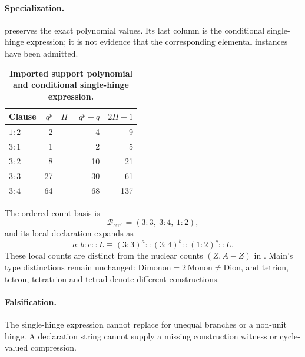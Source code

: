 \paragraph{Specialization.}
 preserves the exact polynomial values. Its last column is the conditional single-hinge expression; it is not evidence that the corresponding elemental instances have been admitted.
\begin{table}[H]
\centering
\caption{\textbf{Imported support polynomial and conditional single-hinge expression.}}
\label{tab:matter1-curling-curl-primitives}
\begin{tabular}{@{}lrrr@{}}
\toprule
Clause & \(q^p\) & \(\Pi=q^p+q\) & \(2\Pi+1\)\\
\midrule
\(1{:}2\) & 2 & 4 & 9\\
\(3{:}1\) & 1 & 2 & 5\\
\(3{:}2\) & 8 & 10 & 21\\
\(3{:}3\) & 27 & 30 & 61\\
\(3{:}4\) & 64 & 68 & 137\\
\bottomrule
\end{tabular}
\end{table}
The ordered count basis is
\begin{equation}
\mathcal B_{\mathrm{curl}}=(3{:}3,\ 3{:}4,\ 1{:}2),
\label{eq:matter1-count-basis}
\end{equation}
and its local declaration expands as
\begin{equation}
a{:}b{:}c::L\equiv(3{:}3)^a::(3{:}4)^b::(1{:}2)^c::L.
\label{eq:matter1-count-expansion}
\end{equation}
These local counts are distinct from the nuclear counts \((Z,A-Z)\) in . Main's type distinctions remain unchanged: \(\mathrm{Dimonon}=2\,\mathrm{Monon}\ne\mathrm{Dion}\), and tetrion, tetron, tetratrion and tetrad denote different constructions.

\paragraph{Falsification.}
The single-hinge expression cannot replace  for unequal branches or a non-unit hinge. A declaration string cannot supply a missing construction witness or cycle-valued compression.

